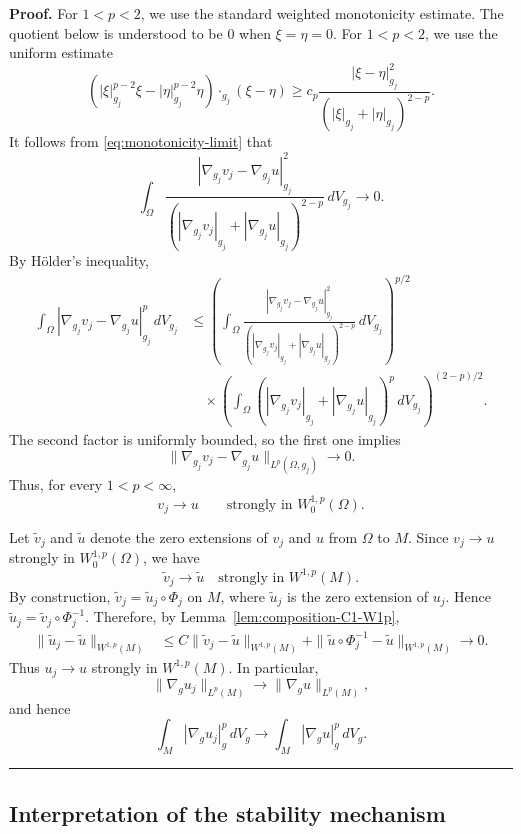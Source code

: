 \documentclass{article}
\newenvironment{proof}[1][Proof]{\textbf{#1.} }{\hfill\rule{0.5em}{0.5em}}
\begin{document}
\begin{proof}
For $1<p<2$, we use the standard weighted monotonicity estimate.
The quotient below is understood to be $0$ when $\xi=\eta=0$.
For $1<p<2$, we use the uniform estimate
\[
\left(
|\xi|_{g_j}^{p-2}\xi-|\eta|_{g_j}^{p-2}\eta
\right)\cdot_{g_j}(\xi-\eta)
\ge c_p
\frac{|\xi-\eta|_{g_j}^2}
{(|\xi|_{g_j}+|\eta|_{g_j})^{2-p}}.
\]
It follows from \eqref{eq:monotonicity-limit} that
\[
\int_\Omega
\frac{|\nabla_{g_j}v_j-\nabla_{g_j}u|_{g_j}^2}
{(|\nabla_{g_j}v_j|_{g_j}+|\nabla_{g_j}u|_{g_j})^{2-p}}
\,dV_{g_j}\longrightarrow0.
\]
By H\"older's inequality,
\begin{align*}
\int_\Omega
|\nabla_{g_j}v_j-\nabla_{g_j}u|_{g_j}^p\,dV_{g_j}
&\leq
\left(
\int_\Omega
\frac{|\nabla_{g_j}v_j-\nabla_{g_j}u|_{g_j}^2}
{(|\nabla_{g_j}v_j|_{g_j}+|\nabla_{g_j}u|_{g_j})^{2-p}}
\,dV_{g_j}
\right)^{p/2}
\\
&\quad\times
\left(
\int_\Omega
(|\nabla_{g_j}v_j|_{g_j}+|\nabla_{g_j}u|_{g_j})^p
\,dV_{g_j}
\right)^{(2-p)/2}.
\end{align*}
The second factor is uniformly bounded, so the first one implies
\[
\|\nabla_{g_j}v_j-\nabla_{g_j}u\|_{L^p(\Omega,g_j)}\longrightarrow0.
\]
Thus, for every $1<p<\infty$,
\[
v_j\longrightarrow u
\qquad\text{strongly in }W_0^{1,p}(\Omega).
\]

Let $\widetilde v_j$ and $\widetilde u$ denote the zero extensions of
$v_j$ and $u$ from $\Omega$ to $M$. Since
$v_j\to u$ strongly in $W_0^{1,p}(\Omega)$, we have
\[
\widetilde v_j\to\widetilde u\quad\text{strongly in }W^{1,p}(M).
\]
By construction, $\widetilde v_j=\widetilde u_j\circ\Phi_j$ on $M$,
where $\widetilde u_j$ is the zero extension of $u_j$. Hence
$\widetilde u_j=\widetilde v_j\circ\Phi_j^{-1}$. Therefore, by
Lemma~\ref{lem:composition-C1-W1p},
\begin{align*}
\|\widetilde u_j-\widetilde u\|_{W^{1,p}(M)}
&\le C\|\widetilde v_j-\widetilde u\|_{W^{1,p}(M)}
+\|\widetilde u\circ\Phi_j^{-1}-\widetilde u\|_{W^{1,p}(M)}
\longrightarrow0.
\end{align*}
Thus $u_j\to u$ strongly in $W^{1,p}(M)$.
In particular,
\[
\|\nabla_g u_j\|_{L^p(M)}
\longrightarrow
\|\nabla_g u\|_{L^p(M)},
\]
and hence
\[
\int_M|\nabla_g u_j|_g^p\,dV_g
\longrightarrow
\int_M|\nabla_g u|_g^p\,dV_g.
\]

\end{proof}


\subsection{Interpretation of the stability mechanism}
\end{document}

